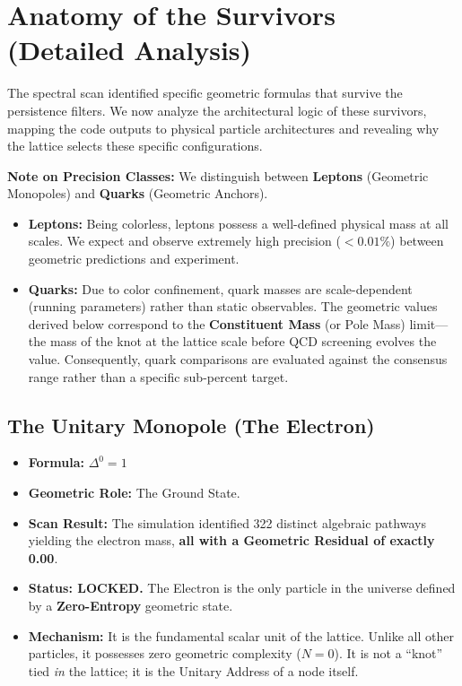 \section{Anatomy of the Survivors (Detailed Analysis)}

The spectral scan identified specific geometric formulas that survive the persistence filters. We now analyze the architectural logic of these survivors, mapping the code outputs to physical particle architectures and revealing why the lattice selects these specific configurations.

\textbf{Note on Precision Classes:} We distinguish between \textbf{Leptons} (Geometric Monopoles) and \textbf{Quarks} (Geometric Anchors).

\begin{itemize}
    \item \textbf{Leptons:} Being colorless, leptons possess a well-defined physical mass at all scales. We expect and observe extremely high precision ($< 0.01\%$) between geometric predictions and experiment.
    \item \textbf{Quarks:} Due to color confinement, quark masses are scale-dependent (running parameters) rather than static observables. The geometric values derived below correspond to the \textbf{Constituent Mass} (or Pole Mass) limit—the mass of the knot at the lattice scale before QCD screening evolves the value. Consequently, quark comparisons are evaluated against the consensus range rather than a specific sub-percent target.
\end{itemize}

\subsection*{The Unitary Monopole (The Electron)}
\begin{itemize}
    \item \textbf{Formula:} $\Delta^0 = 1$
    \item \textbf{Geometric Role:} The Ground State.
    \item \textbf{Scan Result:} The simulation identified 322 distinct algebraic pathways yielding the electron mass, \textbf{all with a Geometric Residual of exactly 0.00}.
    \item \textbf{Status: LOCKED.} The Electron is the only particle in the universe defined by a \textbf{Zero-Entropy} geometric state.
    \item \textbf{Mechanism:} It is the fundamental scalar unit of the lattice. Unlike all other particles, it possesses zero geometric complexity ($N=0$). It is not a ``knot'' tied \textit{in} the lattice; it is the Unitary Address of a node itself.
\end{itemize}

